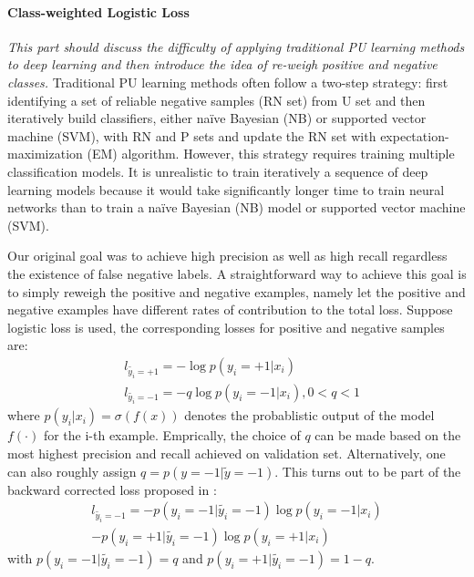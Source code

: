 \paragraph{Class-weighted Logistic Loss}
\noindent \textit{This part should discuss the difficulty of applying traditional PU learning methods to deep learning and then introduce the idea of re-weigh positive and negative classes.}
Traditional PU learning methods often follow a two-step strategy: first identifying a set of reliable negative samples (RN set) from U set and then iteratively build classifiers, either naïve Bayesian (NB) or supported vector machine (SVM), with RN and P sets and update the RN set with expectation-maximization (EM) algorithm.
However, this strategy requires training multiple classification models.
It is unrealistic to train iteratively a sequence of deep learning models because it would take significantly longer time to train neural networks than to train a naïve Bayesian (NB) model or supported vector machine (SVM).

\noindent
Our original goal was to achieve high precision as well as high recall regardless the existence of false negative labels.
A straightforward way to achieve this goal is to simply reweigh the positive and negative examples, namely let the positive and negative examples have different rates of contribution to the total loss.
Suppose logistic loss is used, the corresponding losses for positive and negative samples are:
\begin{equation*}
  \begin{aligned}
    & l_{\tilde{y_i}=+1} = - \log p(y_i=+1|x_i) \\
    & l_{\tilde{y_i}=-1} = - q \log p(y_i=-1 \vert x_i), 0<q<1
  \end{aligned}
\end{equation*}
where $p(y_i \vert x_i)=\sigma(f(x))$ denotes the probablistic output of the model $f(\cdot)$ for the i-th example. Emprically, the choice of $q$ can be made based on the most highest precision and recall achieved on validation set.
Alternatively, one can also roughly assign $q=p(y=-1 \vert \tilde{y}=-1)$.
This turns out to be part of the backward corrected loss proposed in \cite{patrini2016making}:
\begin{equation*}
  \begin{aligned}
    l_{\tilde{y_i}=-1} = - p(y_i=-1 \vert \tilde{y_i}=-1) \log p(y_i=-1 \vert x_i) \\ - p(y_i=+1 \vert \tilde{y_i}=-1) \log p(y_i=+1 \vert x_i)
  \end{aligned}
\end{equation*}
with $p(y_i=-1 \vert \tilde{y_i}=-1) = q$ and $p(y_i=+1 \vert \tilde{y_i}=-1) = 1-q$.


